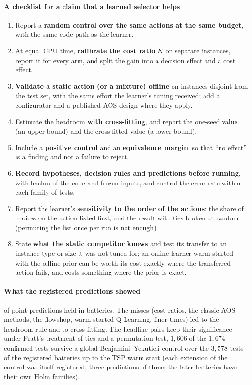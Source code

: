 \paragraph{A checklist for a claim that a learned selector helps}
\begin{enumerate}
\item Report a \textbf{random control over the same actions at the same budget}, with the same code path as the learner.
\item At equal CPU time, \textbf{calibrate the cost ratio} $K$ on separate instances, report it for every arm, and split the gain into a decision effect and a cost effect.
\item \textbf{Validate a static action (or a mixture) offline} on instances disjoint from the test set, with the same effort the learner's tuning received; add a configurator and a published AOS design where they apply.
\item Estimate the headroom \textbf{with cross-fitting}, and report the one-seed value (an upper bound) and the cross-fitted value (a lower bound).
\item Include a \textbf{positive control} and an \textbf{equivalence margin}, so that ``no effect'' is a finding and not a failure to reject.
\item \textbf{Record hypotheses, decision rules and predictions before running}, with hashes of the code and frozen inputs, and control the error rate within each family of tests.
\item Report the learner's \textbf{sensitivity to the order of the actions}: the share of choices on the action listed first, and the result with ties broken at random (permuting the list once per run is not enough).
\item State \textbf{what the static competitor knows} and test its transfer to an instance type or size it was not tuned for; an online learner warm-started with the offline prior can be worth its cost exactly where the transferred action fails, and costs something where the prior is exact.
\end{enumerate}

\paragraph{What the registered predictions showed} \npredheld{} of \npredtotal{} point predictions held in \nbatteries{} batteries. The misses (cost ratios, the classic AOS methods, the flowshop, warm-started Q-Learning, finer times) led to the headroom rule and to cross-fitting. The headline pairs keep their significance under Pratt's treatment of ties and a permutation test, $1{,}606$ of the $1{,}674$ confirmed tests survive a global Benjamini--Yekutieli control over the $3{,}578$ tests of the registered batteries up to the TSP warm start (each extension of the control was itself registered, three predictions of three; the later batteries have their own Holm families).

